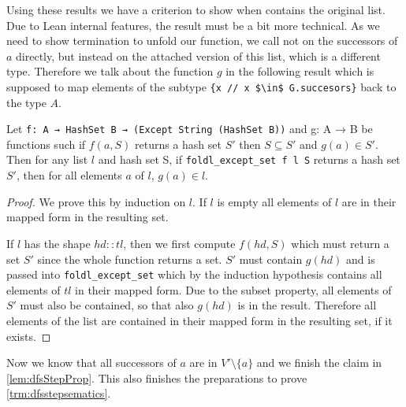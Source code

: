 Using these results we have a criterion to show when \foldlexceptset contains the original list. Due to Lean internal features, the result must be a bit more technical. As we need to show termination to unfold our function, we call \foldlexceptset not on the successors of $a$ directly, but instead on the attached version of this list, which is a different type. Therefore we talk about the function $g$ in the following result which is supposed to map elements of the subtype \lstinline|{x // x $\in$ G.succesors}| back to the type $A$. 

\begin{lemma}[\foldlexceptsetcontainslistmap]
    Let \texttt{f: A → HashSet B → (Except String (HashSet B))} and {g: A → B} be functions such if $f(a,S) $ returns a hash set $S'$  then $S \subseteq S'$ and $g(a) \in S'$. Then for any list $l$ and hash set S,  if \texttt{foldl\_except\_set f l S} returns a hash set $S'$, then for all elements $a$ of $l$, $g(a) \in l$.
\end{lemma}
\begin{proof}
    We prove this by induction on $l$.
    If $l$ is empty all elements of $l$ are in their mapped form in the resulting set.

    If $l$ has the shape $hd::tl$, then we first compute $f(hd,S)$ which must return a set $S'$ since the whole function returns a set. $S'$ must contain $g(hd)$ and is passed into \texttt{foldl\_except\_set} which by the induction hypothesis contains all elements of $tl$ in their mapped form. Due to the subset property, all elements of $S'$ must also be contained, so that also $g(hd)$ is in the result. Therefore all elements of the list are contained in their mapped form in the resulting set, if it exists.
\end{proof}

Now we know that all successors of $a$ are in $V'\setminus\{a\}$ and we finish the claim in \cref{lem:dfsStepProp}. This also finishes the preparations to prove \cref{trm:dfsstepsematics}.

